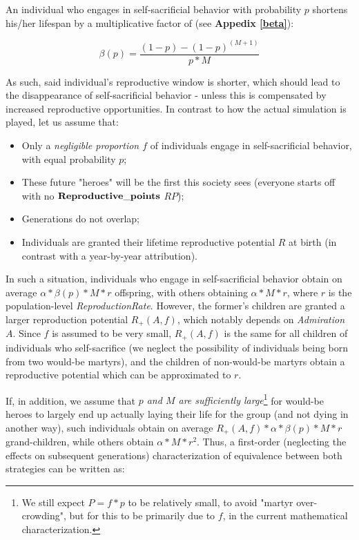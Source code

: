 \documentclass[a4paper,12pt]{article}
\begin{document}
An individual who engages in self-sacrificial behavior with probability $p$
 shortens his/her lifespan by a multiplicative factor of (see \textbf{Appedix \ref{beta}}):
 
\begin{equation}
 \beta(p) = \frac{(1-p) - (1-p)^{(M+1)}}{p*M} 
\label{eq_beta}
\end{equation}

As such, said individual's reproductive window is shorter, which should lead to the disappearance of
 self-sacrificial behavior - unless this is compensated by increased reproductive opportunities. In contrast to how the
 actual simulation is played, let us assume that: 
 \begin{itemize}
\item Only a \textit{negligible proportion $f$} of individuals engage in self-sacrificial behavior, with equal probability $p$;
\item These future "heroes" will be the first this society sees (everyone starts off with no $\bf{Reproductive\_points}$ $RP$);
\item Generations do not overlap;
\item Individuals are granted their lifetime reproductive potential $R$ at birth
(in contrast with a year-by-year attribution).
\end{itemize}
 
In such a situation, individuals who engage in self-sacrificial behavior obtain on average $\alpha*\beta(p)*M*r$ offspring, 
with others obtaining $\alpha*M*r$, where $r$ is the population-level \emph{ReproductionRate}. However,
the former's children are granted a larger reproduction potential $R_+(A,f)$, which notably
depends on \emph{Admiration} $A$. Since $f$ is assumed to be very small, $R_+(A,f)$ is the same for all
children of individuals who self-sacrifice (we neglect the possibility of individuals being born from two
would-be martyrs), and the children of non-would-be martyrs obtain a reproductive potential which can be
approximated to $r$.

If, in addition, we assume that \emph{$p$ and $M$ are sufficiently large}\footnote{We still expect
$P=f*p$ to be relatively small, to avoid "martyr over-crowding",
but for this to be primarily due to $f$, in the current mathematical characterization.}
for would-be heroes to largely end up
actually laying their life for the group (and not dying in another way), such individuals obtain 
on average $R_+(A,f)*\alpha*\beta(p)*M*r$ grand-children, while others obtain $\alpha*M*r^2$. Thus, a first-order
(neglecting the effects on subsequent generations) characterization of equivalence between both strategies can be written as:
 
\end{document}
